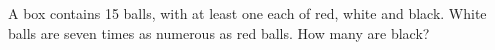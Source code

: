 A box contains 15 balls, with at least one each of red, white and black. White balls are seven times as numerous as red balls. How many are black?
